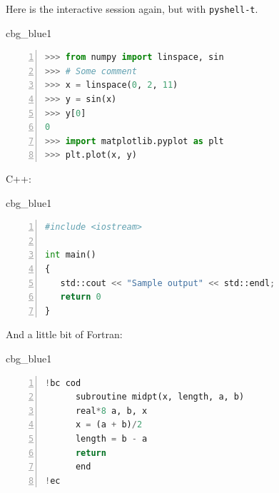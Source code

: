 \n\documentclass[%
oneside,                 %
final,                   %
10pt]{article}
\newenvironment{_cod_tight}[1]{
   \def\FrameCommand{\colorbox{#1}}
   \FrameRule0.6pt\MakeFramed {\FrameRestore}\vskip3mm}
   {\vskip0mm\endMakeFramed}
\newenvironment{cod}[1]{
\bgroup\rmfamily
\fboxsep=0mm\relax
\begin{_cod_tight}{#1}
\list{}{\parsep=-2mm\parskip=0mm\topsep=0pt\leftmargin=2mm
\rightmargin=2\leftmargin\leftmargin=4pt\relax}
\item\relax}
{\endlist\end{_cod_tight}\egroup}
\theoremstyle{definition}
\begin{document}
Here is the interactive session again, but with \texttt{pyshell-t}.










\begin{cod}{cbg_blue1}\begin{lstlisting}[language=Python,style=myspeciallststyle,numbers=left,numberstyle=\tiny,stepnumber=3,numbersep=15pt,xleftmargin=1mm]
>>> from numpy import linspace, sin
>>> # Some comment
>>> x = linspace(0, 2, 11)
>>> y = sin(x)
>>> y[0]
0
>>> import matplotlib.pyplot as plt
>>> plt.plot(x, y)

\end{lstlisting}\end{cod}
\noindent


C++:








\begin{cod}{cbg_blue1}\begin{lstlisting}[language=Python,style=myspeciallststyle,numbers=left,numberstyle=\tiny,stepnumber=3,numbersep=15pt,xleftmargin=1mm]
#include <iostream>

int main()
{
   std::cout << "Sample output" << std::endl;
   return 0
}

\end{lstlisting}\end{cod}
\noindent

And a little bit of Fortran: 










\begin{cod}{cbg_blue1}\begin{lstlisting}[language=Python,style=myspeciallststyle,numbers=left,numberstyle=\tiny,stepnumber=3,numbersep=15pt,xleftmargin=1mm]
!bc cod
      subroutine midpt(x, length, a, b)
      real*8 a, b, x
      x = (a + b)/2
      length = b - a
      return
      end
!ec

\end{lstlisting}\end{cod}
\noindent
\end{document}
